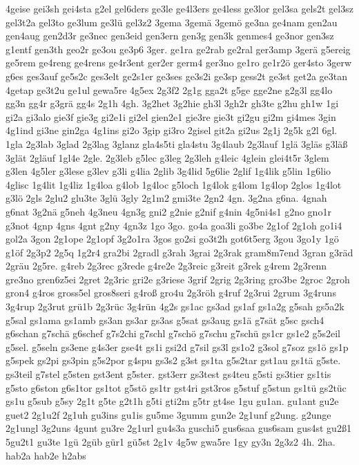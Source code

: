 {4geise
gei3sh
gei4sta
g2el
gel6ders
ge3le
ge4l3ers
ge4less
ge3lor
gel3sa
gels2t
gel3sz
gel3t2a
gel3to
ge3lum
ge3lü
gel3z2
3gema
3gemä
3gemö
ge3na
ge4nam
gen2au
gen4aug
gen2d3r
ge3nec
gen3eid
gen3ern
gen3g
gen3k
genmes4
ge3nor
gen3sz
g1entf
gen3th
geo2r
ge3ou
ge3p6
3ger.
ge1ra
ge2rab
ge2ral
ger3amp
3gerä
g5ereig
ge5rem
ge4reng
ge4rens
ge4r3ent
ger2er
germ4
ger3no
ge1ro
ge1r2ö
ger4sto
3gerw
g6es
ges3auf
ge5s2c
ges3elt
ge2s1er
ge3ses
ge3s2i
ge3sp
gess2t
ge3st
get2a
ge3tan
4getap
ge3t2u
ge1ul
gewa5re
4g5ex
2g3f2
2g1g
gga2t
g5ge
gge2ne
g2g3l
gg4lo
gg3n
gg4r
g3grä
gg4s
2g1h
4gh.
3g2het
3g2hie
gh3l
3gh2r
gh3te
g2hu
gh1w
1gi
gi2a
gi3alo
gie3f
gie3g
gi2e1i
gi2el
gien2e1
gie3re
gie3t
gi2gu
gi2m
gi4mes
3gin
4g1ind
gi3ne
gin2ga
4g1ins
gi2o
3gip
gi3ro
2gisel
git2a
gi2us
2g1j
2g5k
g2l
6gl.
1gla
2g3lab
3glad
2g3lag
3glanz
gla4s5ti
gla4stu
3g4laub
2g3lauf
1glä
3gläs
g3läß
3glät
2gläuf
1gl4e
2gle.
2g3leb
g5lec
g3leg
2g3leh
g4leic
4glein
glei4t5r
3glem
g3len
4g5ler
g3lese
g3lev
g3li
g4lia
2glib
3g4lid
5g6lie
2glif
1g4lik
g5lin
1g6lio
4glisc
1g4lit
1g4liz
1g4loa
g4lob
1g4loc
g5loch
1g4lok
g4lom
1g4lop
2glos
1g4lot
g3lö
2gls
2glu2
glu3te
3glü
3gly
2g1m2
gmi3te
2gn2
4gn.
3g2na
g6na.
4gnah
g6nat
3g2nä
g5neh
4g3neu
4gn3g
gni2
g2nie
g2nif
g4nin
4g5ni4s1
g2no
gno1r
g3not
4gnp
4gns
4gnt
g2ny
4gn3z
1go
3go.
go4a
goa3li
go3be
2g1of
2g1oh
go1i4
gol2a
3gon
2g1ope
2g1opf
3g2o1ra
3gos
go2si
go3t2h
got6t5erg
3gou
3go1y
1gö
g1öf
2g3p2
2g5q
1g2r4
gra2bi
2gradl
g3rah
3grai
2g3rak
gram8m7end
3gran
g3räd
2gräu
2g5re.
g4reb
2g3rec
g3rede
g4re2e
2g3reic
g3reit
g3rek
g4rem
2g3renn
gre3no
gren6z5ei
2gret
2g3ric
gri2e
g3riese
3grif
2grig
2g3ring
gro3be
2groc
2groh
gron4
g4ros
gross5el
gros8seri
g4roß
gro4u
2g3röh
g4ruf
2g3rui
2grum
3g4runs
3g4rup
2g3rut
grü1b
2g3rüc
3g4rün
4g2s
gs1ac
gs3ad
gs1af
gs1a2g
g5sah
gs5a2k
g5sal
gs1ama
gs1amb
gs3an
gs3ar
gs3as
g5sat
gs3aug
gs1ä
g7sät
g5sc
gsch4
g6schan
g7schä
g6schef
g7s2chi
g7schl
g7schö
g7schu
g7schü
gs1cr
gs1e2
g5s2eil
g5sel.
g5seln
gs3ene
g4s3er
gse4t
gs1i
gsi2d
g7sil
gs3l
gs1o2
g3sol
g7soz
gs1ö
gs1p
g5spek
gs2pi
gs3pin
g5s2por
g4spu
gs3s2
g3st
gs1ta
g5s2tar
gst1au
gs1tä
g5ste.
gs3teil
g7stel
g5sten
gst3ent
g5ster.
gst3err
gs3test
gs4teu
g5sti
gs3tier
gs1tis
g5sto
g6ston
g6s1tor
gs1tot
g5stö
gs1tr
gst4ri
gst3ros
g5stuf
g5stun
gs1tü
gs2tüc
gs1u
g5sub
g5sy
2g1t
g5te
g2t1h
g5ti
gti2m
g5tr
gt4se
1gu
gu1an.
gu1ant
gu2e
guet2
2g1u2f
2g1uh
gu3ins
gu1is
gu5me
3gumm
gun2e
2g1unf
g2ung.
g2unge
2g1ungl
3g2uns
4gunt
gu3re
2g1url
gu4s3a
guschi5
gus6saa
gus6sam
gus4st
gu2ß1
5gu2t1
gu3te
1gü
2güb
gür1
gü5st
2g1v
4g5w
gwa5re
1gy
gy3n
2g3z2
4h.
2ha.
hab2a
hab2e
h2abs
}
